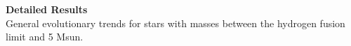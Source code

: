 \textbf{Detailed Results} \\
General evolutionary trends for stars with masses between the hydrogen fusion limit and 5 Msun.